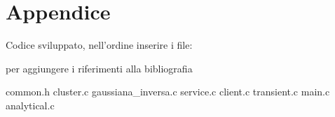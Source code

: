 \chapter{Appendice }
Codice sviluppato, nell'ordine inserire i file:

per aggiungere i riferimenti alla bibliografia \cite{rif1}

common.h
cluster.c
gaussiana\_inversa.c
service.c
client.c
transient.c
main.c
analytical.c
